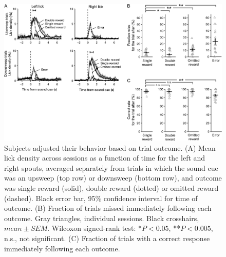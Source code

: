\begin{figure}[htbp]

\begin{center}
\includegraphics[width=\textwidth]{Figures/CC_fig2.png} 
\end{center}

\caption[Outcome-dependent behavioral adjustments]
{Subjects adjusted their behavior based on trial outcome. (A) Mean lick density across sessions as a function of time for the left and right spouts, averaged separately from trials in which the sound cue was an upsweep (top row) or downsweep (bottom row), and outcome was single reward (solid), double reward (dotted) or omitted reward (dashed). Black error bar, 95\% confidence interval for time of outcome. (B) Fraction of trials missed immediately following each outcome. Gray triangles, individual sessions. Black crosshairs, $mean \pm SEM$. Wilcoxon signed-rank test: *$P < 0.05$, **$P < 0.005$, n.s., not significant. (C) Fraction of trials with a correct response immediately following each outcome.}

\label{fig:CC_fig2}
\end{figure}